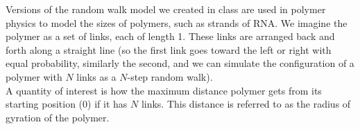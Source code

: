 \documentclass[addpoints, 11pt]{exam}
\begin{document}
\begin{questions}
 Versions of the random walk model we created in class are used in polymer physics to model the sizes of polymers, such as strands of RNA. We imagine the polymer as a set of links, each of length 1. These links are arranged back and forth along a straight line (so the first link goes toward the left or right with equal probability, similarly the second, and we can simulate the configuration of a polymer with $N$ links as a $N$-step random walk).\\

A quantity of interest is how the maximum distance polymer gets from its starting position (0) if it has $N$ links. This distance is referred to as the radius of gyration of the polymer.
\end{questions}
\end{document}
